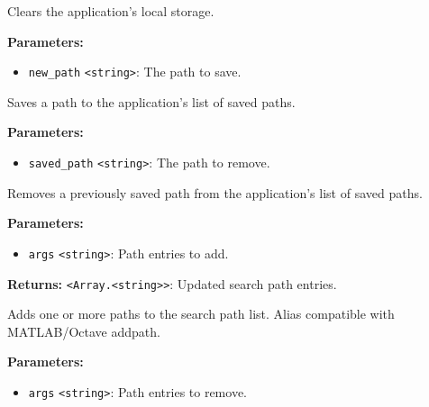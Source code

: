 \documentclass[12pt,a4paper]{article}
\begin{document}
\noindent Clears the application's local storage.

\vspace{5mm}
\noindent {}


\noindent \textbf{Parameters:}
\begin{itemize}
  \item \texttt{new\_path} \texttt{<string>}: The path to save.
\end{itemize}

\noindent Saves a path to the application's list of saved paths.

\vspace{5mm}
\noindent {}


\noindent \textbf{Parameters:}
\begin{itemize}
  \item \texttt{saved\_path} \texttt{<string>}: The path to remove.
\end{itemize}

\noindent Removes a previously saved path from the application's list of saved paths.

\vspace{5mm}
\noindent {}


\noindent \textbf{Parameters:}
\begin{itemize}
  \item \texttt{args} \texttt{<string>}: Path entries to add.
\end{itemize}

\noindent \textbf{Returns:} \texttt{<Array.<string>>}: Updated search path entries.

\noindent Adds one or more paths to the search path list.
Alias compatible with MATLAB/Octave \textasciigrave{}addpath\textasciigrave{}.

\vspace{5mm}
\noindent {}


\noindent \textbf{Parameters:}
\begin{itemize}
  \item \texttt{args} \texttt{<string>}: Path entries to remove.
\end{itemize}
\end{document}
